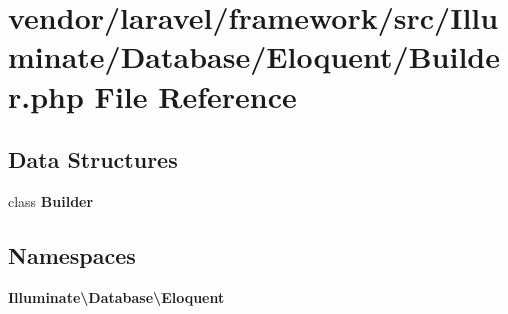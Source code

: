 \section{vendor/laravel/framework/src/\+Illuminate/\+Database/\+Eloquent/\+Builder.php File Reference}
\label{laravel_2framework_2src_2_illuminate_2_database_2_eloquent_2_builder_8php}
\subsection*{Data Structures}
\begin{DoxyCompactItemize}
\item 
class {\bf Builder}
\end{DoxyCompactItemize}
\subsection*{Namespaces}
\begin{DoxyCompactItemize}
\item 
 {\bf Illuminate\textbackslash{}\+Database\textbackslash{}\+Eloquent}
\end{DoxyCompactItemize}
